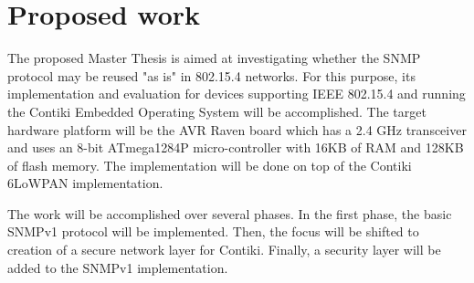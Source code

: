 \documentclass[12pt, titlepage, a4paper]{report}
\begin{document}


 

\chapter{Proposed work}\label{ch:proposal}

The proposed Master Thesis is aimed at investigating whether the SNMP protocol may be reused "as is" in 802.15.4 networks. For this purpose, its implementation and evaluation for devices supporting IEEE 802.15.4 and running the Contiki Embedded Operating System \cite{contiki} will be accomplished. The target hardware platform will be the AVR Raven board which has a 2.4 GHz transceiver and uses an 8-bit ATmega1284P micro-controller with 16KB of RAM and 128KB of flash memory. The implementation will be done on top of the Contiki 6LoWPAN implementation.

The work will be accomplished over several phases. In the first phase, the basic SNMPv1 protocol will be implemented. Then, the focus will be shifted to creation of a secure network layer for Contiki. Finally, a security layer will be added to the SNMPv1 implementation.



\newpage



\nocite{ieee802.15.4}
\nocite{eui64}
\nocite{rfc780}
\nocite{rfc2460}
\nocite{rfc2464}
\nocite{rfc2474}
\nocite{rfc3168}
\nocite{rfc3775}
\nocite{rfc4191}
\nocite{rfc4291}
\nocite{rfc4443}
\nocite{rfc4861}
\nocite{rfc4862}
\nocite{rfc4919}
\nocite{rfc4944}
\nocite{draft-usecases-05}
\nocite{draft-hc-06}
\nocite{draft-nd-07}
\nocite{draft-routing-04}
\nocite{draft-protocols-07}
\nocite{draft-rpl-04}
\nocite{draft-routing-metrics-04}
\nocite{rfc1157}
\nocite{rfc1901}
\nocite{rfc1908}
\nocite{rfc3411}
\nocite{rfc3418}
\end{document}
